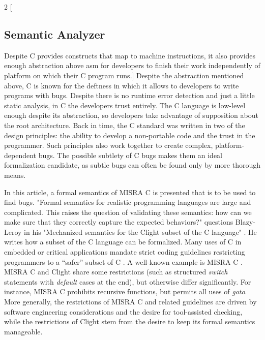 \begin{minipage}{\linewidth}
	\begin{multicols*}{2}
		[
		\vspace{6 mm}
		\subsection{Semantic Analyzer}
		Despite C provides constructs that map to machine instructions, it also provides enough abstraction above \gls{asm} for developers to finish their work independently of platform  on which their C program runs.]
		Despite the abstraction mentioned above, C is known for the deftness in which it allows to developers to write programs with bugs. Despite there is no runtime error detection and just a little static analysis, in C the developers trust entirely. The C language is low-level enough despite its abstraction, so developers take advantage of supposition about the root architecture.  
		Back in time, the C standard was written in two of the design principles: the ability to develop a non-portable code and the trust in the programmer\cite{AmericanNationalStandardsInstitute:1990:RAC:533966}. Such principles also work together to create complex, platform-dependent bugs. The possible subtlety of C bugs makes them an ideal formalization candidate, as subtle bugs can often be found only by more thorough means.
		
		In this article, a formal semantics of \gls{MISRA} C is presented that is to be used to find bugs. "Formal semantics for realistic programming languages are large and complicated. This raises the question of validating these semantics: how can we make sure that they correctly capture the expected behaviors?" questions Blazy-Leroy in his "Mechanized semantics for the Clight subset of the C language" \cite{Blazy}. He writes how a subset of the C language can be formalized. Many uses of C in embedded or critical applications mandate strict coding guidelines restricting programmers to a “safer” subset of C \cite{HATTON2004465}. A well-known example is \gls{MISRA} C \cite{MISRA2004}. \gls{MISRA} C and Clight \cite{Blazy} share some restrictions (such as structured \textit{switch} statements with \textit{default} cases at the end), but otherwise differ significantly. For instance, \gls{MISRA} C prohibits recursive functions, but permits all uses of \textit{goto}. More generally, the restrictions of \gls{MISRA} C and related guidelines are driven by software engineering considerations and the desire for tool-assisted checking, while the restrictions of Clight stem from the desire to keep its formal semantics manageable.
	\end{multicols*}
\end{minipage}

